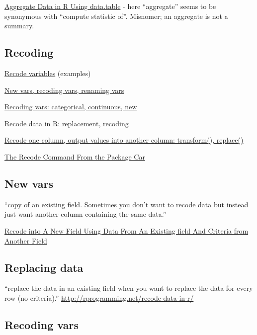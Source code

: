 \documentclass[reqno,12pt]{tufte-book}
\numberwithin{equation}{subsection}
\begin{document}
\href{http://rprogramming.net/aggregate-data-in-r-using-data-table/}{Aggregate
  Data in R Using data.table} - here ``aggregate'' seems to be
synonymous with ``compute statistic of''.  Misnomer; an aggregate is not a summary.

\subsection{Recoding}
\label{subs:recodingr}

\href{http://www.uni-kiel.de/psychologie/rexrepos/posts/recode.html}{Recode variables} (examples)

\href{http://www.statmethods.net/management/variables.html}{New vars, recoding vars, renaming vars}

\href{http://www.cookbook-r.com/Manipulating\_data/Recoding\_data/}{Recoding vars: categorical, continuous, new}

\href{http://rprogramming.net/recode-data-in-r/}{Recode data in R: replacement, recoding}

\href{http://rwiki.sciviews.org/doku.php?id=tips:data-frames:recode_column}{Recode one column, output values into another column: transform(), replace()}

\href{http://rprogramming.net/recode-data-in-r/}{The Recode Command From the Package Car}

\subsection{New vars}
\label{subsub:newvars}

``copy of an existing field. Sometimes you don’t want to recode data but instead just want another column containing the same data.''

\href{http://rprogramming.net/recode-data-in-r/}{Recode into A New Field Using Data From An Existing field And Criteria from Another Field}

\subsection{Replacing data}
\label{subs:}

``replace the data in an existing field when you want to replace the data for every row (no criteria).'' \url{http://rprogramming.net/recode-data-in-r/}

\subsection{Recoding vars}
\label{sub:recodingvars}
\end{document}
